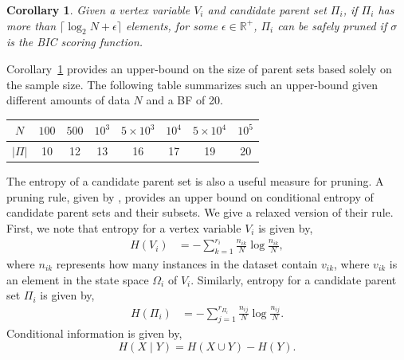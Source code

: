 \documentclass[letterpaper]{article}
\newcommand{\vertex}[1]{V_{#1}}
\newcommand{\parents}{\Pi}
\newcommand{\ceil}[1]{\lceil #1 \rceil}
\newtheorem{corollary}{Corollary}
\begin{document}



\begin{corollary}
	Given a vertex variable $\vertex{i}$ and candidate parent set
	$\Pi_i$, if $\Pi_i$ has more than $\ceil{\log_2 N + \epsilon}$ elements, for some $\epsilon \in \mathbb{R}^+$, $\Pi_i$ can be safely pruned if $\sigma$ is the BIC scoring function. \label{cor:decampossizerelaxed}
	\end{corollary}

Corollary~\ref{cor:decampossizerelaxed} provides an upper-bound on the size of parent sets based solely on the sample size. The following table summarizes such an upper-bound given different amounts of data $N$ and a BF of 20.
\begin{table}[ht]
    \centering
    \begin{tabular}{@{}c||ccccccc@{}}
     $N$ & $100$ & $500$ & $10^{3}$ & $5\times10^{3}$ & $10^{4}$ & $5\times10^{4}$ & $10^{5}$ \\\hline
     $|\parents|$ & 10 & 12 & 13 & 16 & 17 & 19 & 20
    \end{tabular}
    \label{tab:paLim}
\end{table}

The entropy of a candidate parent set is also a useful measure for pruning. A pruning rule, given by \cite{Campos2017}, provides an upper bound on conditional entropy of candidate parent sets and their subsets. We give a relaxed version of their rule. First, we note that entropy for a vertex variable $\vertex{i}$ is given by,
\begin{align*}
    H(\vertex{i}) &=  -\sum^{r_i}_{k=1}\frac{n_{ik}}{N}\log \frac{n_{ik}}{N} ,
\end{align*}
where $n_{ik}$ represents how many instances in the dataset contain $v_{ik}$, where $v_{ik}$ is an element in the state space $\Omega_i$ of $\vertex{i}$. Similarly, entropy for a candidate parent set $\Pi_i$ is given by,
\begin{align*}
    H(\Pi_i) &=  -\sum^{r_{\Pi_i}}_{j=1}\frac{n_{ij}}{N}\log \frac{n_{ij}}{N} .
\end{align*}
Conditional information is given by,
\begin{equation*}
    H(X \mid Y ) = H(X \cup Y) - H(Y) .
\end{equation*}
\end{document}
